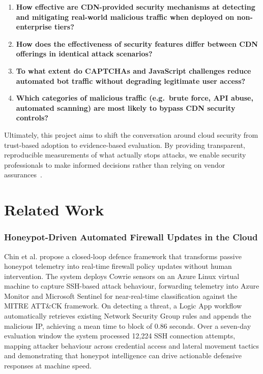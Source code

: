 \documentclass[12pt, a4paper]{report}   %
\begin{document}
\begin{enumerate}

  \item \textbf{How effective are CDN-provided security mechanisms at detecting and
    mitigating real-world malicious traffic when deployed on non-enterprise tiers?}

  \item \textbf{How does the effectiveness of security features differ between CDN offerings in identical
    attack scenarios?}

  \item \textbf{To what extent do CAPTCHAs and JavaScript challenges reduce automated
    bot traffic without degrading legitimate user access?}

  \item \textbf{Which categories of malicious traffic (e.g.\ brute force, API abuse,
    automated scanning) are most likely to bypass CDN security controls?}

\end{enumerate}

Ultimately, this project aims to shift the conversation around cloud security from
trust-based adoption to evidence-based evaluation. By providing transparent,
reproducible measurements of what actually stops attacks, we enable security
professionals to make informed decisions rather than relying on vendor 
assurances~\cite{gartner-cf}.

\chapter{Related Work}
\label{sec:related-work}

\subsection{Honeypot-Driven Automated Firewall Updates in the Cloud 
\cite{chin2025}}

Chin et al.\cite{chin2025} propose a closed-loop defence framework that transforms 
passive honeypot telemetry into real-time firewall policy updates 
without human intervention. The system deploys Cowrie sensors on an 
Azure Linux virtual machine to capture SSH-based attack behaviour, 
forwarding telemetry into Azure Monitor and Microsoft Sentinel for 
near-real-time classification against the MITRE ATT\&CK framework. 
On detecting a threat, a Logic App workflow automatically retrieves 
existing Network Security Group rules and appends the malicious IP, 
achieving a mean time to block of 0.86 seconds. Over a seven-day 
evaluation window the system processed 12,224 SSH connection attempts, 
mapping attacker behaviour across credential access and lateral movement 
tactics and demonstrating that honeypot intelligence can drive 
actionable defensive responses at machine speed.
\end{document}
